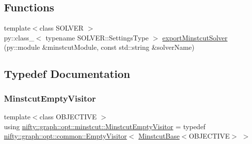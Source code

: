 \subsection*{Functions}
\begin{DoxyCompactItemize}
\item 
{\footnotesize template$<$class S\+O\+L\+V\+ER $>$ }\\py\+::class\+\_\+$<$ typename S\+O\+L\+V\+E\+R\+::\+Settings\+Type $>$ \hyperlink{namespacenifty_1_1graph_1_1opt_1_1minstcut_a6aa5581d72ddc42bc38f3482a33c4761}{export\+Minstcut\+Solver} (py\+::module \&minstcut\+Module, const std\+::string \&solver\+Name)
\end{DoxyCompactItemize}


\subsection{Typedef Documentation}
\mbox{\label{namespacenifty_1_1graph_1_1opt_1_1minstcut_abf938a3f241189100b5df0217faaddfb}} 
\subsubsection{\texorpdfstring{Minstcut\+Empty\+Visitor}{MinstcutEmptyVisitor}}
{\footnotesize\ttfamily template$<$class O\+B\+J\+E\+C\+T\+I\+VE $>$ \\
using \hyperlink{namespacenifty_1_1graph_1_1opt_1_1minstcut_abf938a3f241189100b5df0217faaddfb}{nifty\+::graph\+::opt\+::minstcut\+::\+Minstcut\+Empty\+Visitor} = typedef \hyperlink{classnifty_1_1graph_1_1opt_1_1common_1_1EmptyVisitor}{nifty\+::graph\+::opt\+::common\+::\+Empty\+Visitor}$<$ \hyperlink{classnifty_1_1graph_1_1opt_1_1minstcut_1_1MinstcutBase}{Minstcut\+Base}$<$O\+B\+J\+E\+C\+T\+I\+VE$>$ $>$}

\mbox{\label{namespacenifty_1_1graph_1_1opt_1_1minstcut_aa168742d4d2935e1348ea4b866f3ae09}} 

